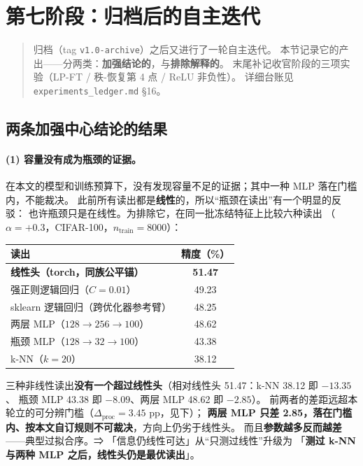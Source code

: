 \documentclass[11pt,a4paper]{ctexart}
\begin{document}
\section{第七阶段：归档后的自主迭代}
\label{sec:v7}

\begin{quote}
\small 归档（tag \texttt{v1.0-archive}）之后又进行了一轮自主迭代。
本节记录它的产出——分两类：\textbf{加强结论的}，与\textbf{排除解释的}。
末尾补记收官阶段的三项实验（LP-FT / 秩-恢复第 4 点 / ReLU 非负性）。
详细台账见 \texttt{experiments\_ledger.md} §16。
\end{quote}

\subsection{两条加强中心结论的结果}

\paragraph{(1) 容量没有成为瓶颈的证据。}
在本文的模型和训练预算下，没有发现容量不足的证据；其中一种 MLP 落在门槛内，不能裁决。
此前所有读出都是\textbf{线性}的，所以“瓶颈在读出”有一个明显的反驳：
也许瓶颈只是在线性。为排除它，在同一批冻结特征上比较六种读出
（$\alpha=+0.3$，CIFAR-100，$n_{\text{train}}=8000$）：

\begin{center}
\small
\begin{tabular}{lc}
\toprule
读出 & 精度（\%） \\
\midrule
\textbf{线性头（torch，同族公平锚）} & \textbf{51.47} \\
强正则逻辑回归（$C=0.01$） & 49.23 \\
sklearn 逻辑回归（跨优化器参考臂） & 48.25 \\
两层 MLP（$128\to256\to100$） & 48.62 \\
瓶颈 MLP（$128\to32\to100$） & 43.38 \\
k-NN（$k=20$） & 38.12 \\
\bottomrule
\end{tabular}
\end{center}

三种非线性读出\textbf{没有一个超过线性头}（相对线性头 51.47：k-NN 38.12 即 $-13.35$、
瓶颈 MLP 43.38 即 $-8.09$、两层 MLP 48.62 即 $-2.85$）。
前两者的差距远超本轮立的可分辨门槛（$\Delta_{\text{proc}}=3.45$ pp，见下）；
\textbf{两层 MLP 只差 2.85，落在门槛内、按本文自订规则不可裁决}，方向上仍劣于线性头。
而且\textbf{参数越多反而越差}——典型过拟合序。⇒ 「信息仍线性可达」从“只测过线性”升级为
「\textbf{测过 k-NN 与两种 MLP 之后，线性头仍是最优读出}」。
\end{document}
